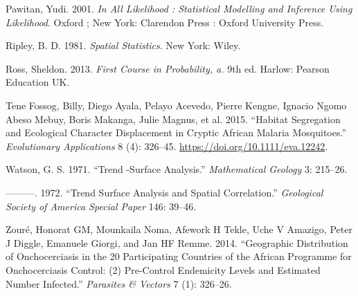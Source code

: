 \documentclass[
  letterpaper,
]{krantz}
\newlength{\cslhangindent}
\newlength{\cslentryspacingunit} %
\newenvironment{CSLReferences}[2] %
 {%
  \setlength{\parindent}{0pt}
  \ifodd #1
  \let\oldpar\par
  \def\par{\hangindent=\cslhangindent\oldpar}
  \fi
  \setlength{\parskip}{#2\cslentryspacingunit}
 }%
 {}
\begin{document}
\begin{CSLReferences}{1}{0}
\leavevmode{}%
Pawitan, Yudi. 2001. \emph{In All Likelihood : Statistical Modelling and
Inference Using Likelihood}. Oxford ; New York: Clarendon Press : Oxford
University Press.

\leavevmode{}%
Ripley, B. D. 1981. \emph{Spatial Statistics}. New York: Wiley.

\leavevmode{}%
Ross, Sheldon. 2013. \emph{First Course in Probability, a.} 9th ed.
Harlow: Pearson Education UK.

\leavevmode{}%
Tene Fossog, Billy, Diego Ayala, Pelayo Acevedo, Pierre Kengne, Ignacio
Ngomo Abeso Mebuy, Boris Makanga, Julie Magnus, et al. 2015. {``Habitat
Segregation and Ecological Character Displacement in Cryptic African
Malaria Mosquitoes.''} \emph{Evolutionary Applications} 8 (4): 326--45.
\url{https://doi.org/10.1111/eva.12242}.

\leavevmode{}%
Watson, G. S. 1971. {``Trend -Surface Analysis.''} \emph{Mathematical
Geology} 3: 215--26.

\leavevmode{}%
---------. 1972. {``Trend Surface Analysis and Spatial Correlation.''}
\emph{Geological Society of America Special Paper} 146: 39--46.

\leavevmode{}%
Zouré, Honorat GM, Mounkaila Noma, Afework H Tekle, Uche V Amazigo,
Peter J Diggle, Emanuele Giorgi, and Jan HF Remme. 2014. {``Geographic
Distribution of Onchocerciasis in the 20 Participating Countries of the
African Programme for Onchocerciasis Control: (2) Pre-Control Endemicity
Levels and Estimated Number Infected.''} \emph{Parasites \& Vectors} 7
(1): 326--26.

\end{CSLReferences}
\end{document}
